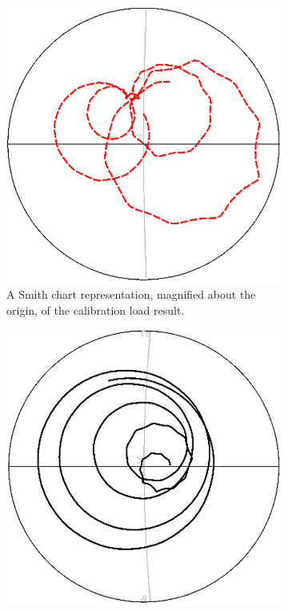 \documentclass[../thesis/thesis.tex]{subfiles}
\begin{document}
\begin{figure}
	\centering
	\begin{subfigure}{0.45\textwidth}
		\centering
	    \includegraphics[width=0.9\linewidth]{dir-a.png}
	    \caption{A Smith chart representation, magnified about the origin, of the calibration load result.}
    \end{subfigure}\hfill%
	\begin{subfigure}{0.45\textwidth}
	    \centering
	    \includegraphics[width=0.9\linewidth]{dir-b.png}

\end{subfigure}
\end{figure}
\end{document}
